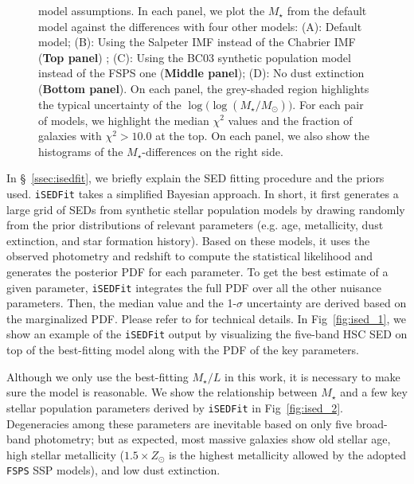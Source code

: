 \documentclass[fleqn,usenatbib]{mnras}
\def\mstar{{$M_{\star}$}}
\def\logms{{$\log (M_{\star}/M_{\odot})$}}
\def\m2l{{$M_{\star}/L$}}
\begin{document}
\begin{figure}
\begin{center}
{            model assumptions. 
            In each panel, we plot the \mstar{} from the default model against the
            differences with four other models:
            (A): Default model; 
            (B): Using the Salpeter IMF instead of the Chabrier IMF 
                (\textbf{Top panel}) ;
            (C): Using the BC03 synthetic population model instead of the FSPS one
                (\textbf{Middle panel});
            (D): No dust extinction (\textbf{Bottom panel}). 
            On each panel, the grey-shaded region highlights the typical uncertainty 
            of the $\log($\logms{}$)$.            
            For each pair of models, we highlight the median $\chi^{2}$ values and 
            the fraction of galaxies with $\chi^{2} > 10.0$ at the top. 
            On each panel, we also show the histograms of the \mstar{}-differences on 
            the right side.
            }
        \label{fig:ised_3}
        \end{center}
    \end{figure}

 
    In \S~\ref{ssec:isedfit}, we briefly explain the SED fitting procedure and 
    the priors used.   
    \texttt{iSEDFit} takes a simplified Bayesian approach. 
    In short, it first generates a large grid of SEDs from synthetic stellar 
    population models by drawing randomly from the prior distributions of relevant
    parameters (e.g. age, metallicity, dust extinction, and star formation history).
    Based on these models, it uses the observed photometry and redshift to compute 
    the statistical likelihood and generates the posterior PDF for each parameter.  
    To get the best estimate of a given parameter, \texttt{iSEDFit} integrates the 
    full PDF over all the other nuisance parameters.
    Then, the median value and the 1-$\sigma$ uncertainty are derived based on the 
    marginalized PDF. 
    Please refer to \citet{Moustakas13} for technical details. 
    In Fig~\ref{fig:ised_1}, we show an example of the \texttt{iSEDFit} output by 
    visualizing the five-band HSC SED on top of the best-fitting model along with the PDF 
    of the key parameters.
     
    Although we only use the best-fitting \m2l{} in this work, it is necessary to make 
    sure the model is reasonable. 
    We show the relationship between \mstar{} and a few key stellar population parameters 
    derived by \texttt{iSEDFit} in Fig~\ref{fig:ised_2}. 
    Degeneracies among these parameters are inevitable based on only five broad-band
    photometry; but as expected, most massive galaxies show old stellar age, high
    stellar metallicity ($1.5 \times Z_{\odot}$ is the highest metallicity allowed by 
    the adopted \texttt{FSPS} SSP models), and low dust extinction.
   
\end{document}
